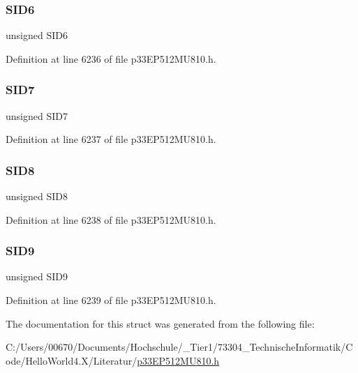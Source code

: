 \subsubsection{\texorpdfstring{S\+I\+D6}{SID6}}
{\footnotesize\ttfamily unsigned S\+I\+D6}



Definition at line 6236 of file p33\+E\+P512\+M\+U810.\+h.

\mbox{\label{structtag_c2_r_x_f1_s_i_d_b_i_t_s_a34097fb76decd431701fa2d86a22328e}} 
\subsubsection{\texorpdfstring{S\+I\+D7}{SID7}}
{\footnotesize\ttfamily unsigned S\+I\+D7}



Definition at line 6237 of file p33\+E\+P512\+M\+U810.\+h.

\mbox{\label{structtag_c2_r_x_f1_s_i_d_b_i_t_s_afe74894633244fdb0b0c01b4e8c522e7}} 
\subsubsection{\texorpdfstring{S\+I\+D8}{SID8}}
{\footnotesize\ttfamily unsigned S\+I\+D8}



Definition at line 6238 of file p33\+E\+P512\+M\+U810.\+h.

\mbox{\label{structtag_c2_r_x_f1_s_i_d_b_i_t_s_a33587704948067005c2a6a3ccc503c99}} 
\subsubsection{\texorpdfstring{S\+I\+D9}{SID9}}
{\footnotesize\ttfamily unsigned S\+I\+D9}



Definition at line 6239 of file p33\+E\+P512\+M\+U810.\+h.



The documentation for this struct was generated from the following file\+:\begin{DoxyCompactItemize}
\item 
C\+:/\+Users/00670/\+Documents/\+Hochschule/\+\_\+\+Tier1/73304\+\_\+\+Technische\+Informatik/\+Code/\+Hello\+World4.\+X/\+Literatur/\hyperlink{p33_e_p512_m_u810_8h}{p33\+E\+P512\+M\+U810.\+h}\end{DoxyCompactItemize}
